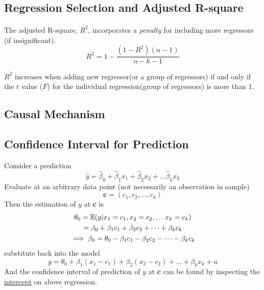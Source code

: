 \documentclass[]{article}
\begin{document}
    	\subsection{Regression Selection and Adjusted R-square}
    		\par The adjusted R-square, $\overline{R^2}$, incorporates a \emph{penalty} for including more regressors (if insignificant).
    		\[
    			\overline{R^2} = 1 - \frac{(1-R^2)(n-1)}{n-k-1}
    		\]
    		\begin{remark}
    			$\overline{R^2}$ increases when adding new regressor(or a group of regressors) if and only if the $t$ value ($F$) for the individual regression(group of regressors) is more than 1.
    		\end{remark}
    	
    	\subsection{Causal Mechanism}
    	
    	\subsection{Confidence Interval for Prediction}
    		\par Consider a prediction 
    		\[
    			\hat{y} = \hat{\beta}_0 + \hat{\beta}_1 x_1 + \hat{\beta}_2 x_2 + \dots \hat{\beta}_k x_k
    		\]
    		Evaluate at an arbitrary data point (not necessarily an observation in sample)
    		\[
    			\textbf{c} = (c_1, c_2, \dots ,c_k)
    		\]
    		Then the estimation of $y$ at \textbf{c} is 
    		\begin{gather*}
    			\theta_0 = \mathbb{E}({y|x_1=c_1, x_2=c_2, \dots x_k=c_k}) \\
    			= \beta_0 + \beta_1 c_1 + \beta_2 c_2 + \dots + \beta_k c_k \\
    			\implies \beta_0 = \theta_0 - \beta_1 c_1 - \beta_2 c_2 - \dots - \beta_k c_k
    		\end{gather*}
    		substitute back into the model
    		\[
    			y = \theta_0 + \beta_1 (x_1 - c_1) + \beta_2 (x_2 - c_2) + \dots + \beta_k x_k + u
    		\]
    		And the confidence interval of prediction of $y$ at \textbf{c} can be found by inspecting the \ul{intercept} on above regression.
\end{document}
